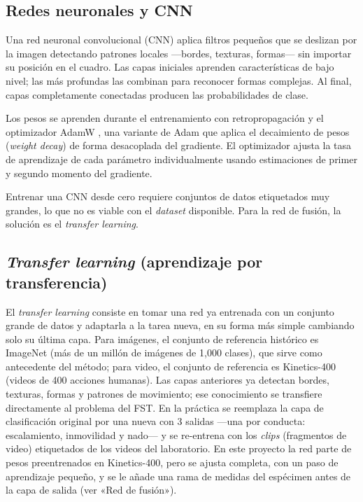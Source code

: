 \subsection{Redes neuronales y CNN}

Una red neuronal convolucional (CNN) \cite{lecun1998} aplica filtros pequeños
que se deslizan por la imagen detectando patrones locales ---bordes,
texturas, formas--- sin importar su posición en el cuadro. Las capas iniciales aprenden
características de bajo nivel; las más profundas las combinan para reconocer formas
complejas. Al final, capas completamente conectadas producen las probabilidades de clase.

Los pesos se aprenden durante el entrenamiento con retropropagación y el optimizador
AdamW \cite{loshchilov2019}, una variante de Adam \cite{kingma2015} que aplica el decaimiento de pesos (\textit{weight decay}) de forma desacoplada del gradiente. El optimizador ajusta la tasa de aprendizaje de cada parámetro individualmente usando estimaciones de primer y segundo momento del gradiente.

Entrenar una CNN desde cero requiere conjuntos de datos etiquetados muy grandes, lo que
no es viable con el \textit{dataset} disponible. Para la red de
fusión, la solución es el \textit{transfer learning}.

\subsection{\textit{Transfer learning} (aprendizaje por transferencia)}

El \textit{transfer learning} \cite{pan2010} consiste en tomar una red ya entrenada con
un conjunto grande de datos y adaptarla a la tarea nueva, en su forma más simple
cambiando solo su última capa. Para
imágenes, el conjunto de referencia histórico es ImageNet (más de un millón de imágenes de 1{,}000 clases), que sirve
como antecedente del método; para video, el conjunto de referencia es Kinetics-400 (videos de 400 acciones humanas). Las capas
anteriores ya detectan bordes, texturas, formas y patrones de movimiento; ese
conocimiento se transfiere directamente al problema del FST. En la práctica se
reemplaza la capa de clasificación original por una nueva con 3 salidas ---una por
conducta: escalamiento, inmovilidad y nado--- y se re-entrena con los \textit{clips} (fragmentos de video) etiquetados de los videos del laboratorio.
En este proyecto la red parte de pesos preentrenados en Kinetics-400, pero se ajusta completa, con un
paso de aprendizaje pequeño, y se le añade una rama de medidas del espécimen antes de la
capa de salida (ver «Red de fusión»).

